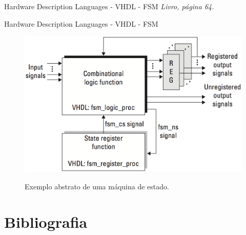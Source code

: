 \documentclass[aspectratio=169]{beamer}
\begin{document}
	\begin{frame}{Hardware Description Languages - VHDL - FSM}
		\textit{Livro, página 64.}
	\end{frame}
	
	\begin{frame}{Hardware Description Languages - VHDL - FSM}
		\begin{figure}[h]
			\centering
			\caption{Exemplo abstrato de uma máquina de estado.}
			\includegraphics[height=0.77\textheight]{img/print/fsm.png}
			\label{fig:fsm}
		\end{figure}
	\end{frame}

\maketitle


\section{Bibliografia}




\maketitle
\end{document}
